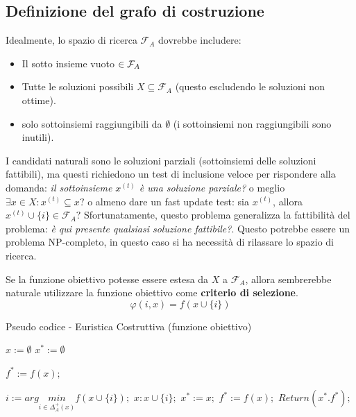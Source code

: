 \documentclass{article}
\begin{document}
    \subsection{Definizione del grafo di costruzione}
    Idealmente, lo spazio di ricerca $\mathcal{F}_A$ dovrebbe includere:
    \begin{itemize}
        \item Il sotto insieme vuoto $\empty \in \mathcal{F}_A$
        \item Tutte le soluzioni possibili $X\subseteq\mathcal{F}_A$ (questo escludendo
              le soluzioni non ottime).
        \item solo sottoinsiemi raggiungibili da $\emptyset$ (i sottoinsiemi non raggiungibili sono inutili).
    \end{itemize}
    I candidati naturali sono le soluzioni parziali (sottoinsiemi delle soluzioni fattibili), ma questi
    richiedono un test di inclusione veloce per rispondere alla domanda:
    \textit{il sottoinsieme $x^{(t)}$ è una soluzione parziale?} o meglio $\exists x \in X : x^{(t)}\subseteq x?$
    o almeno dare un fast update test: sia $x^{(t)}$, allora $x^{(t)} \cup \{i\}\in\mathcal{F}_A?$
    Sfortunatamente, questo problema generalizza la fattibilità del problema: \textit{è qui presente qualsiasi soluzione fattibile?}.
    Questo potrebbe essere un problema NP-completo, in questo caso si ha necessità di rilassare lo spazio di ricerca.

    Se la funzione obiettivo potesse essere estesa da $X$ a $\mathcal{F}_A$, allora sembrerebbe naturale
    utilizzare la funzione obiettivo come \textbf{criterio di selezione}.
    $$\varphi(i,x)=f(x\cup\{i\})$$
    \begin{algorithm}[H]
        \caption{Pseudo codice - Euristica Costruttiva (funzione obiettivo)}
        \label{alg:cons_heu_fx}
        \begin{algorithmic}
            \State $x:=\emptyset$
            \State $x^*:=\emptyset$

            \State $f^*:=f(x);$
            \Else
            \EndIf

            \State $i:=arg\underset{i\in\Delta_A^+(x)}{min}f(x\cup\{i\});$
            \State $x:x\cup\{i\};$
            \State $x^* := x;$
            \State $f^* := f(x);$
            \EndIf
            \EndWhile
            \State $Return(x^*.f^*);$
        \end{algorithmic}
    \end{algorithm}
\end{document}
